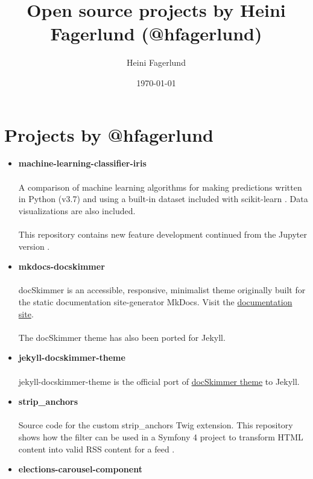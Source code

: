 \documentclass[11pt]{article}
\author{Heini Fagerlund}
\date{\today}
\title{Open source projects by Heini Fagerlund (@hfagerlund)}
\begin{document}
\maketitle

\section{Projects by @hfagerlund}
\label{sec-1}
\begin{itemize}
\item \textbf{machine-learning-classifier-iris}
  \paragraph{}
  A comparison of machine learning algorithms for making predictions written in Python (v3.7) and using a built-in dataset included with scikit-learn \cite{machinelearning}. Data visualizations are also included.
\paragraph{}
  This repository contains new feature development continued from the Jupyter version \cite{jupyter}.
\item \textbf{mkdocs-docskimmer}
\paragraph{}
docSkimmer is an accessible, responsive, minimalist theme originally built for the static documentation site-generator MkDocs. Visit the \href{http://bitsof.bytesofdesign.com/mkdocs-docskimmer/}{documentation site}.
\paragraph{}
The docSkimmer theme has also been ported for Jekyll.
\item \textbf{jekyll-docskimmer-theme}
   \paragraph{}
  jekyll-docskimmer-theme is the official port of \href{https://github.com/hfagerlund/mkdocs-docskimmer}{docSkimmer theme} to Jekyll.
\item \textbf{strip\_anchors}
   \paragraph{}
   Source code for the custom strip\_anchors Twig extension. This repository shows how the filter can be used in a Symfony 4 project to transform HTML content into valid RSS content for a feed \cite{stripanchors}.
\item \textbf{elections-carousel-component}

\end{itemize}
\end{document}
